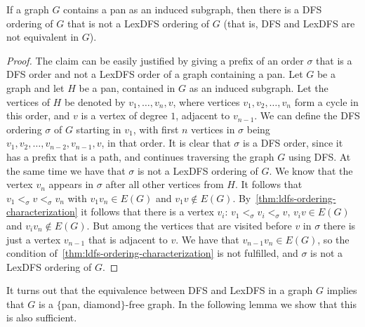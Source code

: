 \documentclass{svproc}
\begin{document}
\begin{lemma}
If a graph $G$ contains a pan as an induced subgraph, 
then there is a DFS ordering of $G$ that is not a LexDFS ordering of $G$ (that is, DFS and LexDFS are not equivalent in $G$).
\end{lemma}
\begin{proof}
The claim can be easily justified by giving a prefix of an order $\sigma$ that is a DFS order and not a LexDFS order of a graph containing a pan.
Let $G$ be a graph and let $H$ be a pan, contained in $G$ as an induced subgraph. Let the vertices of $H$ be denoted by $v_1,\dots, v_n, v$, where vertices $v_1,v_2,\dots, v_n$ form a cycle in this order, and $v$ is a vertex of degree $1$, adjacent to $v_{n-1}$. 
We can define the DFS ordering $\sigma$ of $G$ starting in $v_1$, with first $n$ vertices in $\sigma$ being $v_1,v_2,\dots, v_{n-2}, v_{n-1},v$, in that order. It is clear that $\sigma $ is a DFS order, since it has a prefix that is a path, and continues traversing the graph $G$ using DFS. At the same time we have that $\sigma$ is not a LexDFS ordering of $G$. We know that the vertex $v_n$ appears in $\sigma$ after all other vertices from $H$. It follows that $v_1<_\sigma v<_\sigma v_n$ with $v_1v_n\in E(G)$ and $v_1v\notin E(G)$. By~\cref{thm:ldfs-ordering-characterization} it follows that there is a vertex $v_i$: $v_1<_\sigma v_i<_\sigma v$, $v_iv\in E(G)$ and $v_iv_n\notin E(G)$. But among the vertices that are visited before $v$ in $\sigma$ there is just a vertex $v_{n-1}$ that is adjacent to $v$. We have that $v_{n-1}v_n\in E(G)$, so the condition of~\cref{thm:ldfs-ordering-characterization} is not fulfilled, and $\sigma $ is not a LexDFS ordering of $G$.  
\end{proof}
It turns out that the equivalence between DFS and LexDFS in a graph $G$ implies that $G$ is a $\{$pan, diamond$\}$-free graph. In the following lemma we show that this is also sufficient. 
\end{document}
